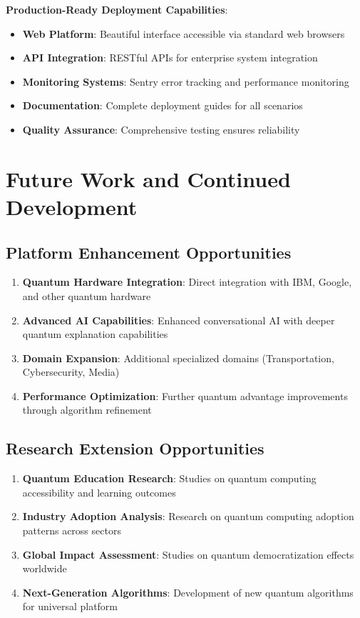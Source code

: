 \documentclass[12pt,a4paper]{article}
\begin{document}
\textbf{Production-Ready Deployment Capabilities}:
\begin{itemize}
    \item \textbf{Web Platform}: Beautiful interface accessible via standard web browsers
    \item \textbf{API Integration}: RESTful APIs for enterprise system integration
    \item \textbf{Monitoring Systems}: Sentry error tracking and performance monitoring
    \item \textbf{Documentation}: Complete deployment guides for all scenarios
    \item \textbf{Quality Assurance}: Comprehensive testing ensures reliability
\end{itemize}

\section{Future Work and Continued Development}

\subsection{Platform Enhancement Opportunities}

\begin{enumerate}
    \item \textbf{Quantum Hardware Integration}: Direct integration with IBM, Google, and other quantum hardware
    \item \textbf{Advanced AI Capabilities}: Enhanced conversational AI with deeper quantum explanation capabilities
    \item \textbf{Domain Expansion}: Additional specialized domains (Transportation, Cybersecurity, Media)
    \item \textbf{Performance Optimization}: Further quantum advantage improvements through algorithm refinement
\end{enumerate}

\subsection{Research Extension Opportunities}

\begin{enumerate}
    \item \textbf{Quantum Education Research}: Studies on quantum computing accessibility and learning outcomes
    \item \textbf{Industry Adoption Analysis}: Research on quantum computing adoption patterns across sectors
    \item \textbf{Global Impact Assessment}: Studies on quantum democratization effects worldwide
    \item \textbf{Next-Generation Algorithms}: Development of new quantum algorithms for universal platform
\end{enumerate}
\end{document}
